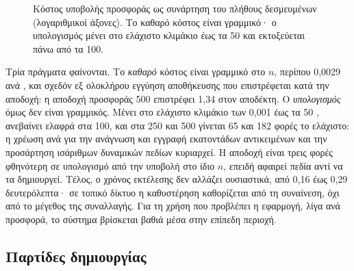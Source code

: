 \begin{figure}[H]
\centering
{}
\caption{Κόστος υποβολής προσφοράς ως συνάρτηση του πλήθους δεσμευμένων 
(λογαριθμικοί άξονες). Το καθαρό κόστος είναι γραμμικό· ο υπολογισμός μένει στο ελάχιστο
κλιμάκιο έως τα 50 και εκτοξεύεται πάνω από τα 100.}
\label{fig:stress-bidsize}
\end{figure}

Τρία πράγματα φαίνονται. Το \emph{καθαρό} κόστος είναι γραμμικό στο $n$, περίπου 0{,}0029
 ανά , και σχεδόν εξ ολοκλήρου εγγύηση αποθήκευσης που
επιστρέφεται κατά την αποδοχή: η αποδοχή προσφοράς 500  επιστρέφει 1{,}34
 στον αποδέκτη. Ο \emph{υπολογισμός} όμως δεν είναι γραμμικός. Μένει στο
ελάχιστο κλιμάκιο των 0{,}001  έως τα 50 , ανεβαίνει ελαφρά
στα 100, και στα 250 και 500 γίνεται 65 και 182 φορές το ελάχιστο: η χρέωση ανά
 για την ανάγνωση και εγγραφή εκατοντάδων αντικειμένων και την προσάρτηση
ισάριθμων δυναμικών πεδίων κυριαρχεί. Η αποδοχή είναι τρεις φορές φθηνότερη σε
υπολογισμό από την υποβολή στο ίδιο $n$, επειδή αφαιρεί πεδία αντί να τα δημιουργεί.
Τέλος, ο χρόνος εκτέλεσης δεν αλλάζει ουσιαστικά, από 0{,}16 έως 0{,}29 δευτερόλεπτα· σε
τοπικό δίκτυο η καθυστέρηση καθορίζεται από τη συναίνεση, όχι από το μέγεθος της
συναλλαγής. Για τη χρήση που προβλέπει η εφαρμογή, λίγα  ανά προσφορά, το
σύστημα βρίσκεται βαθιά μέσα στην επίπεδη περιοχή.

\subsection{Παρτίδες δημιουργίας}

